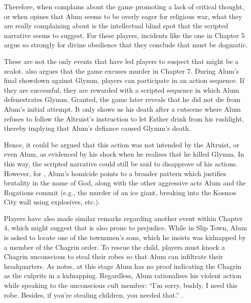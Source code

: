 Therefore, when \textcite[para. 3]{adam_review_2015} complains about the game promoting a lack of critical thought, or when \textcite[9:43]{innuendo_studios_co-vids_2020} opines that Alum seems to be overly eager for religious war, what they are really complaining about is the intellectual blind spot that the scripted narrative seems to suggest. For these players, incidents like the one in Chapter 5 argue so strongly for divine obedience that they conclude that \textcite{orsie_alum_2006} must be dogmatic.

These are not the only events that have led players to suspect that \textcite{orsie_alum_2006} might be a zealot. \textcite[9:50]{innuendo_studios_co-vids_2020} also argues that the game excuses murder in Chapter 7. During Alum's final showdown against Glymm, players can participate in an action sequence. If they are successful, they are rewarded with a scripted sequence in which Alum defenestrates Glymm. Granted, the game later reveals that he did not die from Alum's initial attempt. It only shows us his death after a cutscene where Alum refuses to follow the Altruist's instruction to let Esther drink from his rushlight, thereby implying that Alum's defiance caused Glymm's death. 

Hence, it could be argued that this action was not intended by the Altruist, or even Alum, as evidenced by his shock when he realises that he killed Glymm. In this way, the scripted narrative could still be said to disapprove of his actions. However, for \textcite{innuendo_studios_co-vids_2020}, Alum's homicide points to a broader pattern which justifies brutality in the name of God, along with the other aggressive acts Alum and the Rogations commit (e.g., the murder of an ice giant, breaking into the Kosmos City wall using explosives, etc.).

Players have also made similar remarks regarding another event within Chapter 4, which might suggest that \textcite{orsie_alum_2006} is also prone to prejudice. While in Slip Town, Alum is asked to locate one of the townsmen's sons, which he insists was kidnapped by a member of the Chagrin order. To rescue the child, players must knock a Chagrin unconscious to steal their robes so that Alum can infiltrate their headquarters. As \textcite[9:27]{innuendo_studios_co-vids_2020} notes, at this stage Alum has no proof indicating the Chagrin as the culprits in a kidnapping. Regardless, Alum rationalises his violent action while speaking to the unconscious cult member: ``I'm sorry, buddy, I need this robe. Besides, if you're stealing children, you needed that.'' \parencite{orsie_alum_2006}.


